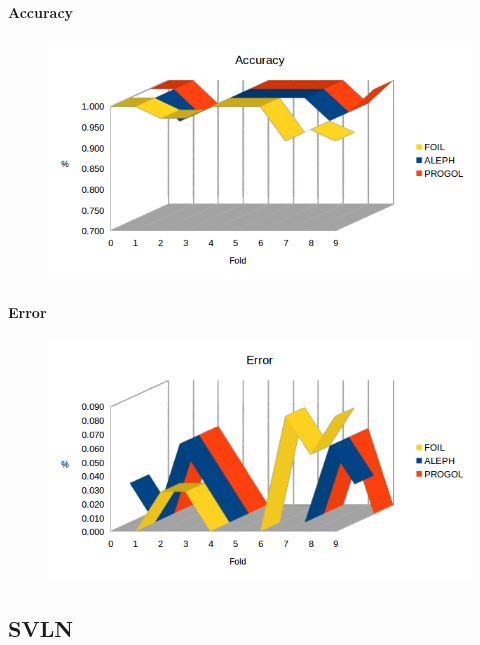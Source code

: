 \paragraph{Accuracy}
\begin{figure}[h!tbp]
	\includegraphics[width=1.2\textwidth]{img/datasetGraph/jmlr/accuracy.png}
	\label{JMLR-Accuracy}
\end{figure}
\paragraph{Error}
\begin{figure}[h!tbp]
	\includegraphics[width=1.2\textwidth]{img/datasetGraph/jmlr/error.png}
	\label{JMLR-Error}
\end{figure}

\subsection{SVLN}
